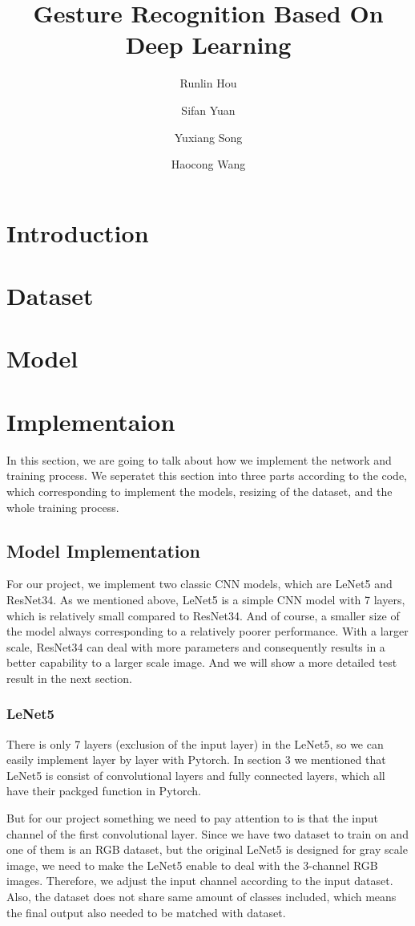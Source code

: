 \documentclass[12pt]{article}
\begin{document}
\title{\textbf{Gesture Recognition Based On Deep Learning}}
\author{Runlin Hou \and Sifan Yuan \and Yuxiang Song \and Haocong Wang}
\maketitle

\section{Introduction}
\section{Dataset}
\section{Model}
\section{Implementaion}
In this section, we are going to talk about how we implement the network and training process. We seperatet this section into three parts according to the code, which corresponding to implement the models, resizing of the dataset, and the whole training process.
\subsection{Model Implementation}
For our project, we implement two classic CNN models, which are LeNet5 and ResNet34. As we mentioned above, LeNet5 is a simple CNN model with 7 layers, which is relatively small compared to ResNet34. And of course, a smaller size of the model always corresponding to a relatively poorer performance. With a larger scale, ResNet34 can deal with more parameters and consequently results in a better capability to a larger scale image. And we will show a more detailed test result in the next section.
\subsubsection*{LeNet5}
There is only 7 layers (exclusion of the input layer) in the LeNet5, so we can easily implement layer by layer with Pytorch. In section 3 we mentioned that LeNet5 is consist of convolutional layers and fully connected layers, which all have their packged function in Pytorch. 

But for our project something we need to pay attention to is that the input channel of the first convolutional layer. Since we have two dataset to train on and one of them is an RGB dataset, but the original LeNet5 is designed for gray scale image, we need to make the LeNet5 enable to deal with the 3-channel RGB images. Therefore, we adjust the input channel according to the input dataset. Also, the dataset does not share same amount of classes included, which means the final output also needed to be matched with dataset.
\end{document}
